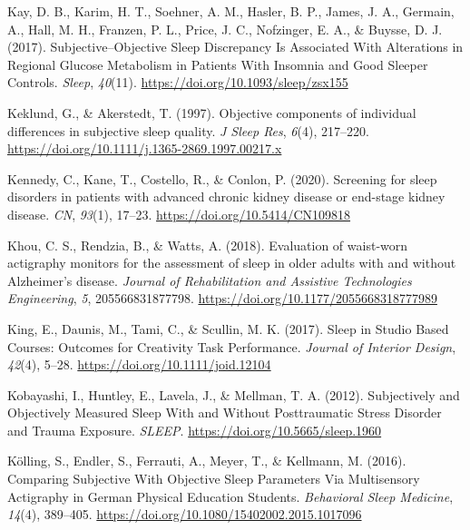 \documentclass[
]{article}
\newlength{\cslhangindent}
\newenvironment{CSLReferences}[2] %
 {\begin{list}{}{%
  \setlength{\itemindent}{0pt}
  \setlength{\leftmargin}{0pt}
  \setlength{\parsep}{0pt}
  \ifodd #1
   \setlength{\leftmargin}{\cslhangindent}
   \setlength{\itemindent}{-1\cslhangindent}
  \fi
  \setlength{\itemsep}{#2\baselineskip}}}
 {\end{list}}
\begin{document}
\begin{CSLReferences}{1}{0}
Kay, D. B., Karim, H. T., Soehner, A. M., Hasler, B. P., James, J. A., Germain, A., Hall, M. H., Franzen, P. L., Price, J. C., Nofzinger, E. A., \& Buysse, D. J. (2017). Subjective--{Objective} {Sleep} {Discrepancy} {Is} {Associated} {With} {Alterations} in {Regional} {Glucose} {Metabolism} in {Patients} {With} {Insomnia} and {Good} {Sleeper} {Controls}. \emph{Sleep}, \emph{40}(11). \url{https://doi.org/10.1093/sleep/zsx155}

Keklund, G., \& Akerstedt, T. (1997). Objective components of individual differences in subjective sleep quality. \emph{J Sleep Res}, \emph{6}(4), 217--220. \url{https://doi.org/10.1111/j.1365-2869.1997.00217.x}

Kennedy, C., Kane, T., Costello, R., \& Conlon, P. (2020). Screening for sleep disorders in patients with advanced chronic kidney disease or end-stage kidney disease. \emph{CN}, \emph{93}(1), 17--23. \url{https://doi.org/10.5414/CN109818}

Khou, C. S., Rendzia, B., \& Watts, A. (2018). Evaluation of waist-worn actigraphy monitors for the assessment of sleep in older adults with and without {Alzheimer}'s disease. \emph{Journal of Rehabilitation and Assistive Technologies Engineering}, \emph{5}, 205566831877798. \url{https://doi.org/10.1177/2055668318777989}

King, E., Daunis, M., Tami, C., \& Scullin, M. K. (2017). Sleep in {Studio} {Based} {Courses}: {Outcomes} for {Creativity} {Task} {Performance}. \emph{Journal of Interior Design}, \emph{42}(4), 5--28. \url{https://doi.org/10.1111/joid.12104}

Kobayashi, I., Huntley, E., Lavela, J., \& Mellman, T. A. (2012). Subjectively and {Objectively} {Measured} {Sleep} {With} and {Without} {Posttraumatic} {Stress} {Disorder} and {Trauma} {Exposure}. \emph{SLEEP}. \url{https://doi.org/10.5665/sleep.1960}

Kölling, S., Endler, S., Ferrauti, A., Meyer, T., \& Kellmann, M. (2016). Comparing {Subjective} {With} {Objective} {Sleep} {Parameters} {Via} {Multisensory} {Actigraphy} in {German} {Physical} {Education} {Students}. \emph{Behavioral Sleep Medicine}, \emph{14}(4), 389--405. \url{https://doi.org/10.1080/15402002.2015.1017096}


\end{CSLReferences}
\end{document}
